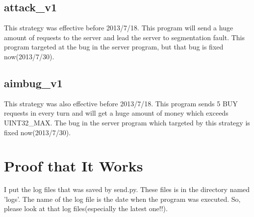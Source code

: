 \documentclass{article}
\begin{document}

        \subsection{attack\_v1} %
        \label{sub:attack_v1}

            This strategy was effective before 2013/7/18.
            This program will send a huge amount of requests to the server and lead the server to segmentation fault.
            This program targeted at the bug in the server program,
            but that bug is fixed now(2013/7/30).


        \subsection{aimbug\_v1} %
        \label{sub:aimbug_v1}

            This strategy was also effective before 2013/7/18.
            This program sends 5 BUY requests in every turn and will get a huge amount of money which exceeds UINT32\_MAX.
            The bug in the server program which targeted by this strategy is fixed now(2013/7/30).



    \section{Proof that It Works} %
    \label{sec:proof_that_it_works}

        I put the log files that was saved by send.py.
        These files is in the directory named 'logs'.
        The name of the log file is the date when the program was executed.
        So, please look at that log files(especially the latest one!!).

\end{document}

